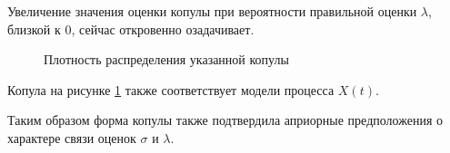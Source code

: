 Увеличение значения оценки копулы при вероятности правильной оценки $\lambda$, близкой к 0, сейчас откровенно озадачивает.

\begin{figure}[H]
	{}
	\caption{Плотность распределения указанной копулы}
	\label{fig:biglambda}
\end{figure}
Копула на рисунке \ref{fig:biglambda} также соответствует модели процесса $X(t)$.

Таким образом форма копулы также подтвердила априорные предположения о характере связи оценок $\sigma$ и $\lambda$.

\clearpage
